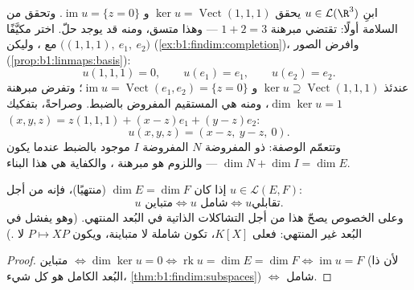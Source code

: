 \begin{example}
\label{ex:b1:linmaps:tospec}
ابنِ $u \in \mathcal{L}(\R^3)$ يحقق $\ker u =
\operatorname{Vect}(1,1,1)$ و $\operatorname{im} u = \{z =
0\}$. وتحقق من السلامة أولًا: تقتضي مبرهنة  $1 + 2 = 3$ ---
وهذا متسق، ومنه قد يوجد حلّ. اختر  مكيَّفًا مع
، وليكن $\bigl((1,1,1),\ e_1,\ e_2\bigr)$
(\cref{ex:b1:findim:completion})، وافرض الصور
(\cref{prop:b1:linmaps:basis}):
\[
u(1,1,1) = 0, \qquad u(e_1) = e_1, \qquad u(e_2) = e_2 .
\]
عندئذ $\ker u \supseteq \operatorname{Vect}(1,1,1)$ و
$\operatorname{im} u = \operatorname{Vect}(e_1, e_2) = \{z =
0\}$؛ وتفرض مبرهنة  $\dim\ker u = 1$، ومنه 
هي المستقيم المفروض بالضبط. وصراحةً، بتفكيك $(x, y, z)
= z(1,1,1) + (x - z)e_1 + (y - z)e_2$:
\[
u(x, y, z) = (x - z,\ y - z,\ 0).
\]
وتتعمّم الوصفة:  ذو  المفروضة $N$
 المفروضة $I$ موجود بالضبط عندما يكون $\dim N + \dim I = \dim E$
--- واللزوم هو مبرهنة ، والكفاية هي هذا
البناء.
\end{example}

\begin{corollary}\label{cor:b1:linmaps:samedim}
إذا كان $\dim E = \dim F$ (منتهيًا)، فإنه من أجل $u \in \mathcal{L}(E, F)$:
\[
u \text{ متباين} \iff u \text{ شامل} \iff u \text{
تقابلي}.
\]
وعلى الخصوص يصحّ هذا من أجل التشاكلات الذاتية في البُعد المنتهي. (وهو
يفشل في البُعد غير المنتهي: فعلى $K[X]$، تكون  شاملة
لا متباينة، ويكون $P \mapsto XP$  لا
.)
\end{corollary}

\begin{proof}
متباين $\iff \dim\ker u = 0 \iff \operatorname{rk} u = \dim E =
\dim F \iff \operatorname{im} u = F$ (لأن  ذا البُعد الكامل
هو كل شيء، \cref{thm:b1:findim:subspaces}) $\iff$ شامل.
\end{proof}

